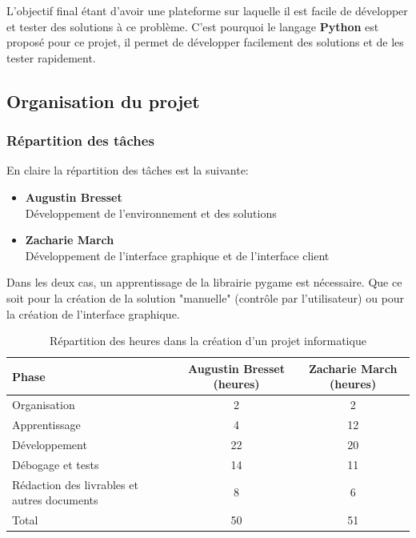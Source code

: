 \documentclass[french,a4paper,10pt,twocolumn]{article}
\begin{document}
L'objectif final étant d'avoir une plateforme sur laquelle il est facile de développer et tester des solutions à ce problème.
C'est pourquoi le langage \textbf{Python} est proposé pour ce projet, il permet de développer facilement des solutions et de les tester rapidement. 

\subsection{Organisation du projet}

\subsubsection{Répartition des tâches}

En claire la répartition des tâches est la suivante:
\begin{itemize}
    \item \textbf{Augustin Bresset}\\
        Développement de l'environnement et des solutions 
    \item \textbf{Zacharie March}\\
        Développement de l'interface graphique et de l'interface client
\end{itemize}
Dans les deux cas, un apprentissage de la librairie pygame est nécessaire. Que ce soit pour la création de la solution "manuelle" (contrôle par l'utilisateur)
ou pour la création de l'interface graphique.

\begin{table}[h!]
    \centering
    \caption{Répartition des heures dans la création d'un projet informatique}
    \begin{tabular}{|>{\raggedright}m{5cm}|c|c|}
        \hline
        \textbf{Phase} & \textbf{Augustin Bresset (heures)} & \textbf{Zacharie March (heures)} \\
        \hline
        Organisation & 2 & 2 \\
        \hline
        Apprentissage & 4 & 12 \\
        \hline
        Développement & 22 & 20 \\
        \hline
        Débogage et tests & 14 & 11 \\
        \hline
        Rédaction des livrables et autres documents & 8 & 6 \\
        \hline
        Total & 50 & 51 \\
        \hline
    \end{tabular}
    \label{tab:repartition_heures}
\end{table}
\end{document}
